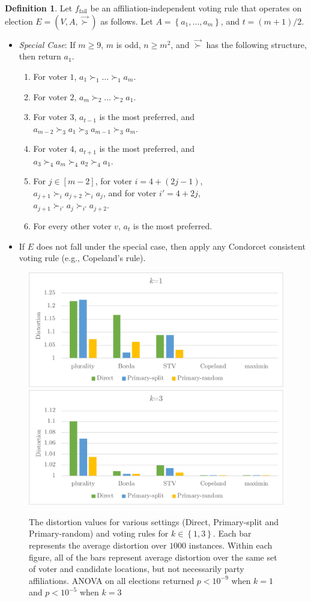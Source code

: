 \documentclass[letterpaper]{article} %
\theoremstyle{definition}
\newtheorem{definition}{Definition}
\newcommand{\set}[1]{\left\{#1\right\}}
\renewcommand{\vec}{\overrightarrow}
\newcommand{\vsucc}{\vec{\succ}}
\newcommand{\fail}{{\textrm{fail}}}
\begin{document}
\begin{definition}
	Let $f_\fail$ be an affiliation-independent voting rule that operates on election $E = (V,A,\vsucc)$ as follows. Let $A = \set{a_1,\ldots,a_m}$, and $t = (m+1)/2$.
\begin{itemize}
	\item \emph{Special Case}: If $m \ge 9$, $m$ is odd, $n \ge m^2$, and $\vsucc$ has the following structure, then return $a_1$.
	\begin{enumerate}
		\item For voter $1$, $a_1 \succ_1 \ldots \succ_1 a_m$.
		\item For voter $2$, $a_m \succ_2 \ldots \succ_2 a_1$.
		\item For voter $3$, $a_{t-1}$ is the most preferred, and \\ $a_{m-2} \succ_3 a_1 \succ_3 a_{m-1} \succ_3 a_m$.
		\item For voter $4$, $a_{t+1}$ is the most preferred, and \\ $a_3 \succ_4 a_m \succ_4 a_2 \succ_4 a_1$.
		\item For $j \in [m-2]$, for voter $i = 4+(2j-1)$, \\ $a_{j+1} \succ_i a_{j+2} \succ_i a_j$, and for voter $i' = 4+2j$, \\ $a_{j+1} \succ_{i'} a_j \succ_{i'} a_{j+2}$.
		\item For every other voter $v$, $a_t$ is the most preferred.
			\end{enumerate}

	\item If $E$ does not fall under the special case, then apply any Condorcet consistent voting rule (e.g., Copeland's rule).
\end{itemize}
\end{definition}
\begin{figure}
\centering
\includegraphics[width=0.47\linewidth]{distortion_1.pdf}
\hspace{0.05\linewidth}
\includegraphics[width=0.47\linewidth]{distortion_3.pdf}
\caption {The distortion values for various settings (Direct, Primary-split and Primary-random) and voting rules for $k \in \set{1,3}$. Each bar represents the average distortion over $1000$ instances. Within each figure, all of the bars represent average distortion over the same set of voter and candidate locations, but not necessarily party affiliations. ANOVA on all elections returned $p<10^{-9}$ when $k=1$ and $p<10^{-5}$ when $k=3$}
\label{distortions}
\end{figure}
\end{document}
